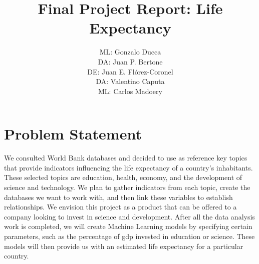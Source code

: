 \documentclass{other/docTemplate}
\author{ML: Gonzalo Ducca \formatemail{gonzaloducca@gmail.com} \\ DA: Juan P. Bertone \formatemail{bertonejpb@gmail.com} \\ DE: Juan E. Flórez-Coronel \formatemail{juan.florez@upr.edu} \\ DA: Valentino Caputa \formatemail{caputavalentino@gmail.com} \\ ML: Carlos Madoery \formatemail{ccmadoery@gmail.com}}
\title{Final Project Report: Life Expectancy}
\begin{document}
 
\maketitle

\startTable
{}
\stopTable

\tableofcontents
\newpage
\listoftables
\newpage
\listoffigures
\newpage
\printglossary[title=List of Acronyms ,type=\acronymtype]
\clearpage




\section{Problem Statement}
We consulted World Bank databases and decided to use as reference key topics that provide indicators influencing the life expectancy of a country's inhabitants. These selected topics are education, health, economy, and the development of science and technology.
We plan to gather indicators from each topic, create the databases we want to work with, and then link these variables to establish relationships. We envision this project as a product that can be offered to a company looking to invest in science and development.
After all the data analysis work is completed, we will create Machine Learning models by specifying certain parameters, such as the percentage of \gls{gdp} invested in education or science. These models will then provide us with an estimated life expectancy for a particular country.
\end{document}
